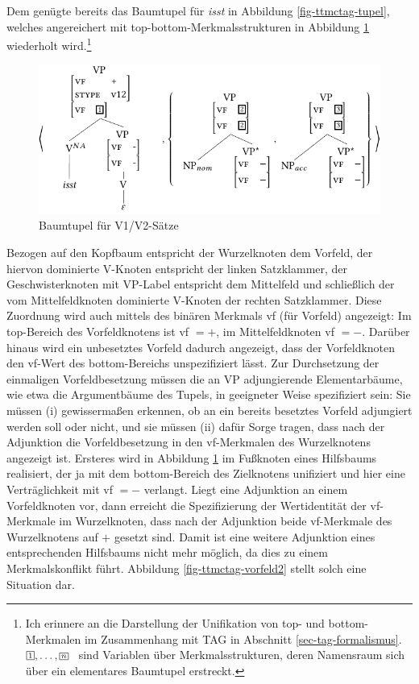 Dem genügte bereits das Baumtupel für {\it isst} in Abbildung \ref{fig-ttmctag-tupel}, welches angereichert mit {\sc top}-{\sc bottom}-Merkmalsstrukturen in Abbildung \ref{fig-ttmctag-v12} wiederholt wird.\footnote{Ich erinnere an die Darstellung der Unifikation von {\sc top}- und {\sc bottom}-Merkmalen im Zusammenhang mit TAG in Abschnitt \ref{sec-tag-formalismus}. $\svar{1},\ldots,\svar{n}$ \ sind Variablen über Merkmalsstrukturen, deren Namensraum sich über ein elementares Baumtupel erstreckt.}  
\begin{figure}[t]
\centering
\includegraphics{graphics/abb76.pdf}
\caption{\label{fig-ttmctag-v12} Baumtupel für V1/V2-Sätze}
\end{figure} 
Bezogen auf den Kopfbaum entspricht der Wurzelknoten dem Vorfeld, der hiervon dominierte V-Knoten entspricht der linken Satzklammer, der Geschwisterknoten mit VP-Label entspricht dem Mittelfeld und schlie\ss lich der vom Mittelfeldknoten dominierte V-Knoten der rechten Satzklammer. Diese Zuordnung wird auch mittels des binären Merkmals {\sc vf} (für Vorfeld) angezeigt: Im {\sc top}-Bereich des Vorfeldknotens ist {\sc vf} $= +$, im Mittelfeldknoten {\sc vf} $= -$. Darüber hinaus wird ein unbesetztes Vorfeld dadurch angezeigt, dass der Vorfeldknoten den {\sc vf}-Wert des {\sc bottom}-Bereichs unspezifiziert lässt. Zur Durchsetzung der einmaligen Vorfeldbesetzung müssen die an VP adjungierende Elementarbäume, wie etwa die Argumentbäume des Tupels, in geeigneter Weise spezifiziert sein: Sie müssen (i) gewisserma\ss en erkennen, ob an ein bereits besetztes Vorfeld adjungiert werden soll oder nicht, und sie  müssen (ii) dafür Sorge tragen, dass nach der Adjunktion die Vorfeldbesetzung in den {\sc vf}-Merkmalen des Wurzelknotens angezeigt ist. Ersteres wird in Abbildung \ref{fig-ttmctag-v12} im Fu\ss knoten eines Hilfsbaums realisiert, der ja mit dem {\sc bottom}-Bereich des Zielknotens unifiziert und hier eine Verträglichkeit mit {\sc vf} $=-$ verlangt. Liegt eine Adjunktion an einem Vorfeldknoten vor, dann erreicht die Spezifizierung der Wertidentität der {\sc vf}-Merkmale im Wurzelknoten, dass nach der Adjunktion beide {\sc vf}-Merkmale des Wurzelknotens auf $+$ gesetzt sind. Damit ist eine weitere Adjunktion eines entsprechenden Hilfsbaums nicht mehr möglich, da dies zu einem Merkmalskonflikt führt. Abbildung \ref{fig-ttmctag-vorfeld2} stellt solch eine Situation dar. 
